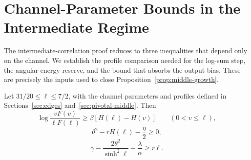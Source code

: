\section{Channel-Parameter Bounds in the Intermediate Regime}
\label{app:middle-channel}

The intermediate-correlation proof reduces to three inequalities that
depend only on the channel. We establish the profile comparison needed
for the log-sum step, the angular-energy reserve, and the bound that
absorbs the output bias. These are precisely the inputs used to close
Proposition~\ref{prop:middle-growth}.

\begin{appendixlemma}
\label{lem:middle-channel-checks}
Let \(31/20\le\ell\le7/2\), with the channel parameters and
profiles defined in Sections~\ref{sec:edges}
and~\ref{sec:pivotal-middle}. Then
\begin{equation}
 \log\frac{vF(v)}{\ell F(\ell)}
 \ge\beta[H(\ell)-H(v)]\qquad(0<v\le\ell),
 \label{eq:middle-profile-check}
\end{equation}
\begin{equation}
 \theta^2-rH(\ell)-\frac\eta2\ge0,
 \label{eq:middle-energy-check}
\end{equation}
\begin{equation}
 \gamma-\frac{2\theta^2}{\sinh^2\ell}-\frac\lambda\alpha
 \ge r\ell.
 \label{eq:middle-mean-check}
\end{equation}
\end{appendixlemma}

